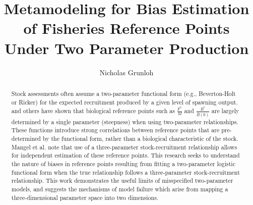 \documentclass[12pt]{article}
\begin{document}
%
%

\title{\vspace*{-2.25cm}Metamodeling for Bias Estimation of Fisheries Reference Points Under Two Parameter Production} %
\author{Nicholas Grunloh}
\maketitle

\begin{abstract}
Stock assessments often assume a two-parameter functional form
(e.g., Beverton-Holt or Ricker) for the expected recruitment produced by a
given level of spawning output.  %
and others have shown that biological reference points such as $\frac{F^*}{M}$
and $\frac{B^*}{\bar{B}(0)}$ are largely determined by a single parameter
(steepness) when using two-parameter relationships. These functions introduce
strong correlations between reference points that are pre-determined by
the functional form, rather than a biological characteristic of the stock.
Mangel et al. note that use of a three-parameter stock-recruitment
relationship allows for independent estimation of these reference points. This
research seeks to understand the nature of biases in reference points
resulting from fitting a two-parameter logistic functional form when the true
relationship follows a three-parameter stock-recruitment relationship. This  %
work demonstrates the useful limits of misspecified two-parameter models, 
and suggests the mechanisms of model failure which arise from mapping a 
three-dimensional parameter space into two dimensions.
\end{abstract}
\end{document}
